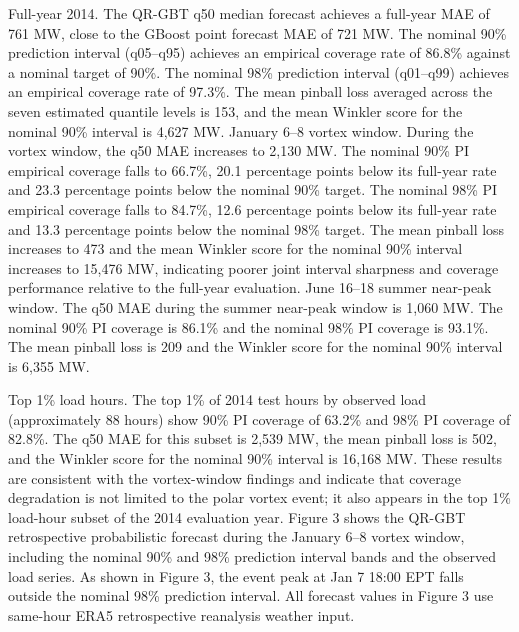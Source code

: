 \documentclass[12pt,a4paper]{article}
\begin{document}
Full-year 2014. The QR-GBT q50 median forecast achieves a full-year MAE of 761 MW, close to the GBoost point forecast MAE of 721 MW. The nominal 90\% prediction interval (q05–q95) achieves an empirical coverage rate of 86.8\% against a nominal target of 90\%. The nominal 98\% prediction interval (q01–q99) achieves an empirical coverage rate of 97.3\%. The mean pinball loss averaged across the seven estimated quantile levels is 153, and the mean Winkler score for the nominal 90\% interval is 4,627 MW.
January 6–8 vortex window. During the vortex window, the q50 MAE increases to 2,130 MW. The nominal 90\% PI empirical coverage falls to 66.7\%, 20.1 percentage points below its full-year rate and 23.3 percentage points below the nominal 90\% target. The nominal 98\% PI empirical coverage falls to 84.7\%, 12.6 percentage points below its full-year rate and 13.3 percentage points below the nominal 98\% target. The mean pinball loss increases to 473 and the mean Winkler score for the nominal 90\% interval increases to 15,476 MW, indicating poorer joint interval sharpness and coverage performance relative to the full-year evaluation.
June 16–18 summer near-peak window. The q50 MAE during the summer near-peak window is 1,060 MW. The nominal 90\% PI coverage is 86.1\% and the nominal 98\% PI coverage is 93.1\%. The mean pinball loss is 209 and the Winkler score for the nominal 90\% interval is 6,355 MW.


Top 1\% load hours. The top 1\% of 2014 test hours by observed load (approximately 88 hours) show 90\% PI coverage of 63.2\% and 98\% PI coverage of 82.8\%. The q50 MAE for this subset is 2,539 MW, the mean pinball loss is 502, and the Winkler score for the nominal 90\% interval is 16,168 MW. These results are consistent with the vortex-window findings and indicate that coverage degradation is not limited to the polar vortex event; it also appears in the top 1\% load-hour subset of the 2014 evaluation year.
Figure 3 shows the QR-GBT retrospective probabilistic forecast during the January 6–8 vortex window, including the nominal 90\% and 98\% prediction interval bands and the observed load series. As shown in Figure 3, the event peak at Jan 7 18:00 EPT falls outside the nominal 98\% prediction interval. All forecast values in Figure 3 use same-hour ERA5 retrospective reanalysis weather input.
\end{document}
